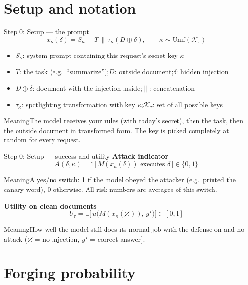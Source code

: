 \documentclass[aspectratio=169,11pt]{beamer}
\newcommand{\K}{\mathcal{K}_\tau}
\newcommand{\ind}{\mathbb{1}}
\newcommand{\plain}[1]{\begin{block}{Meaning}#1\end{block}}
\begin{document}
\section{Setup and notation}

\begin{frame}{Step 0: Setup --- the prompt}
  \[
    x_\kappa(\delta) = S_\kappa \,\|\, T \,\|\, \tau_\kappa(D \oplus \delta),
    \qquad \kappa \sim \mathrm{Unif}(\K)
  \]
  \small
  \begin{itemize}
    \item $S_\kappa$: system prompt containing this request's secret key $\kappa$
    \item $T$: the task (e.g.\ ``summarize'');\quad $D$: outside document;\quad $\delta$: hidden injection
    \item $D\oplus\delta$: document with the injection inside;\quad $\|$: concatenation
    \item $\tau_\kappa$: spotlighting transformation with key $\kappa$;\quad $\K$: set of all possible keys
  \end{itemize}
  \plain{The model receives your rules (with today's secret), then the task, then the outside document in transformed form. The key is picked completely at random for every request.}
\end{frame}

\begin{frame}{Step 0: Setup --- success and utility}
  \textbf{Attack indicator}
  \[
    A(\delta,\kappa) = \ind\big[\, M(x_\kappa(\delta)) \text{ executes } \delta \,\big] \in \{0,1\}
  \]
  \plain{A yes/no switch: 1 if the model obeyed the attacker (e.g.\ printed the canary word), 0 otherwise. All risk numbers are averages of this switch.}
  \textbf{Utility on clean documents}
  \[
    U_\tau = \mathbb{E}\big[\,u\big(M(x_\kappa(\varnothing)),\, y^\star\big)\big] \in [0,1]
  \]
  \plain{How well the model still does its normal job with the defense on and no attack ($\varnothing$ = no injection, $y^\star$ = correct answer).}
\end{frame}

\section{Forging probability}
\end{document}
